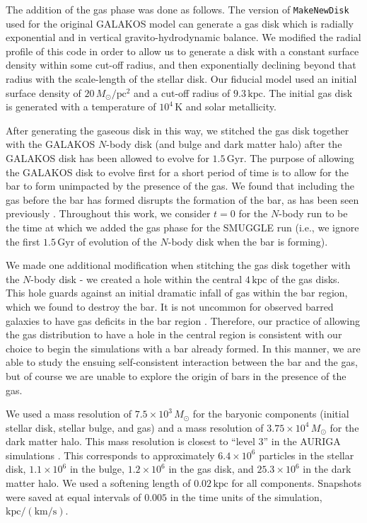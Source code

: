 \documentclass[fleqn,usenatbib]{mnras}
\newcommand{\Nbody}{$N$-body}
\begin{document}
The addition of the gas phase was done as follows. The version of
\texttt{MakeNewDisk} used for the original GALAKOS model can generate a gas disk
which is radially exponential and in vertical gravito-hydrodynamic balance. We
modified the radial profile of this code in order to allow us to generate a disk
with a constant surface density within some cut-off radius, and then
exponentially declining beyond that radius with the scale-length of the stellar
disk. Our fiducial model used an initial surface density of
$20\,M_{\odot}/\textrm{pc}^2$ and a cut-off radius of $9.3\,\textrm{kpc}$. The
initial gas disk is generated with a temperature of $10^4\,\textrm{K}$ and solar
metallicity.

After generating the gaseous disk in this way, we stitched the gas disk together
with the GALAKOS \Nbody{} disk (and bulge and dark matter halo) after the
GALAKOS disk has been allowed to evolve for $1.5\,\textrm{Gyr}$. The purpose of
allowing the GALAKOS disk to evolve first for a short period of time is to allow
for the bar to form unimpacted by the presence of the gas. We found that
including the gas before the bar has formed disrupts the formation of the bar,
as has been seen previously \citep[e.g.,][]{2013MNRAS.429.1949A}. Throughout
this work, we consider $t=0$ for the \Nbody{} run to be the time at which we
added the gas phase for the SMUGGLE run (i.e., we ignore the first
$1.5\,\textrm{Gyr}$ of evolution of the \Nbody{} disk when the bar is forming).

We made one additional modification when stitching the gas disk together with
the \Nbody{} disk - we created a hole within the central $4\,\textrm{kpc}$ of
the gas disks. This hole guards against an initial dramatic infall of gas within
the bar region, which we found to destroy the bar. It is not uncommon for
observed barred galaxies to have gas deficits in the bar region \citep[though
not in the very center;][]{1993RPPh...56..173S}. Therefore, our practice of
allowing the gas distribution to have a hole in the central region is consistent
with our choice to begin the simulations with a bar already formed. In this
manner, we are able to study the ensuing self-consistent interaction between the
bar and the gas, but of course we are unable to explore the origin of bars in
the presence of the gas.

We used a mass resolution of $7.5\times10^3\,M_{\odot}$ for the baryonic
components (initial stellar disk, stellar bulge, and gas) and a mass resolution
of $3.75\times10^4\,M_{\odot}$ for the dark matter halo. This mass resolution is
closest to ``level 3'' in the AURIGA simulations \citep{2017MNRAS.467..179G}.
This corresponds to approximately $6.4\times10^6$ particles in the stellar disk,
$1.1\times10^6$ in the bulge, $1.2\times10^6$ in the gas disk, and
$25.3\times10^6$ in the dark matter halo. We used a softening length of
$0.02\,\textrm{kpc}$ for all components. Snapshots were saved at equal intervals
of $0.005$ in the time units of the simulation,
$\textrm{kpc}/(\textrm{km}/\textrm{s})$.
\end{document}
